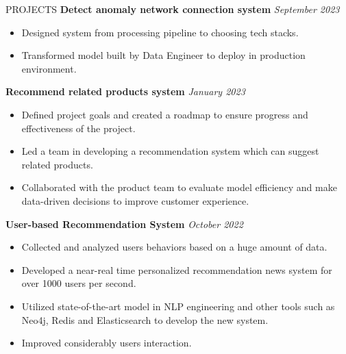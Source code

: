 \documentclass{resume} %
\begin{document}
\begin{rSection}{PROJECTS}
    \textbf{Detect anomaly network connection system} \hfill {\textit{September 2023}}
     \begin{itemize}
     \setlength\itemsep{-0.5 em}
        \item Designed system from processing pipeline to choosing tech stacks.
        \item Transformed model built by Data Engineer to deploy in production environment.
     \end{itemize}
     
    \textbf{Recommend related products system} \hfill {\textit{January 2023}}
     \begin{itemize}
     \setlength\itemsep{-0.5 em}
        \item Defined project goals and created a roadmap to ensure progress and effectiveness of the project.
        \item Led a team in developing a recommendation system which can suggest related products. 
         \item Collaborated with the product team to evaluate model efficiency and make data-driven decisions to improve customer experience.
     \end{itemize}

     \pagebreak
    \textbf{User-based Recommendation System} \hfill {\textit{October 2022}}
    \begin{itemize}
        \item Collected and analyzed users behaviors based on a huge amount of data.
        \item Developed a near-real time personalized recommendation news system for over 1000 users per second.
        \item Utilized state-of-the-art model in NLP engineering and other tools such as Neo4j, Redis and Elasticsearch to develop the new system.
        \item Improved considerably users interaction.
    \end{itemize}

     
     
\end{rSection}
\end{document}
